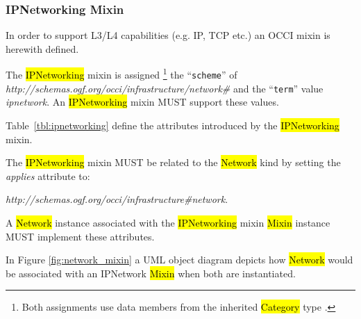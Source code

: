 \documentclass[10pt,a4paper]{article}
\begin{document}
\subsubsection{IPNetworking Mixin}

In order to support L3/L4 capabilities (e.g. IP, TCP etc.) an OCCI
mixin is herewith defined.

The \hl{IPNetworking} mixin is assigned%
\footnote{Both assignments use data members from the inherited
  \hl{Category} type \cite{occi:core}.}  the ``{\tt scheme}'' of
\textit{http://schemas.ogf.org/occi/infrastructure/network\#} and the
``{\tt term}'' value \textit{ipnetwork}. An \hl{IPNetworking} mixin
MUST support these values.

Table~\ref{tbl:ipnetworking} define the attributes introduced by the
\hl{IPNetworking} mixin.

The \hl{IPNetworking} mixin MUST be related to the \hl{Network} kind
by setting the \textit{applies} attribute to:

\textit{http://schemas.ogf.org/occi/infrastructure\#network}.

A \hl{Network} instance associated with the
\hl{IPNetworking} mixin \hl{Mixin} instance MUST implement these
attributes.


In Figure \ref{fig:network_mixin} a UML object diagram depicts how
\hl{Network} would be associated with an IPNetwork \hl{Mixin} when
both are instantiated.
\end{document}

